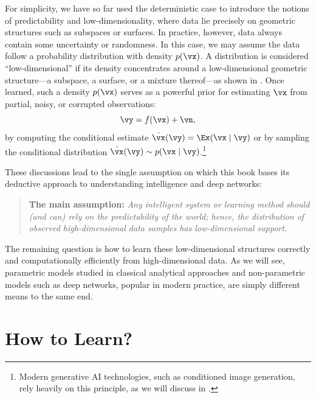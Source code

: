 \documentclass[../../book-main.tex]{subfiles}
\begin{document}
For simplicity, we have so far used the deterministic case to
introduce the notions of predictability and low-dimensionality, where
data lie precisely on geometric structures such as subspaces or
surfaces. In practice, however, data always contain some uncertainty
or randomness. In this case, we may assume the data follow a
probability distribution with density \(p(\vx)\). A distribution is
considered ``low-dimensional'' if its density concentrates around a
low-dimensional geometric structure---a subspace, a surface, or a
mixture thereof---as shown in . Once
learned, such a density \(p(\vx)\) serves as a powerful prior for
estimating \(\vx\) from partial, noisy, or corrupted observations:
\begin{equation}
    \vy = f(\vx) + \vn,
    \label{eqn:noisy-observation}
\end{equation}
by computing the conditional estimate \(\hat{\vx}(\vy) = \Ex(\vx \mid
\vy)\) or by sampling the conditional distribution \(\hat{\vx}(\vy)
\sim p(\vx\mid \vy)\).\footnote{Modern generative AI technologies,
    such as conditioned image generation, rely heavily on this principle,
as we will discuss in .}

These discussions lead to the single assumption on which this book
bases its deductive approach to understanding intelligence and deep networks:
\begin{quote}
    \textbf{The main assumption:} \textit{Any intelligent system or
        learning method should (and can) rely on the predictability of
        the world; hence, the distribution of observed high-dimensional
    data samples has low-dimensional support.}
\end{quote}
The remaining question is how to learn these low-dimensional
structures correctly and computationally efficiently from
high-dimensional data. As we will see, parametric models studied in
classical analytical approaches and non-parametric models such as
deep networks, popular in modern practice, are simply different means
to the same end.

\section{How to Learn?}
\end{document}
